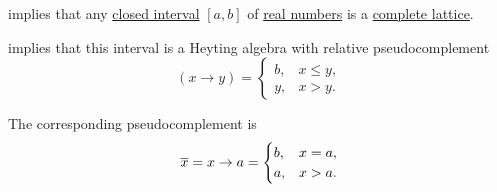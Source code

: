 \begin{example}
\begin{thmenum}
      implies that any \hyperref[def:order_interval/closed]{closed interval} \( [a, b] \) of \hyperref[def:real_numbers]{real numbers} is a \hyperref[def:complete_lattice]{complete lattice}.

     implies that this interval is a Heyting algebra with relative pseudocomplement
    \begin{equation*}
      (x \rightarrow y) = \begin{cases}
        b, &x \leq y, \\
        y, &x > y.
      \end{cases}
    \end{equation*}

    The corresponding pseudocomplement is
    \begin{equation*}
      \oline{x}
      =
      x \rightarrow a
      =
      \begin{cases}
        b, &x = a, \\
        a, &x > a.
      \end{cases}
    \end{equation*}
  \end{thmenum}
\end{example}


